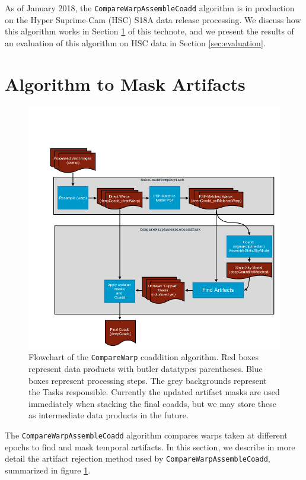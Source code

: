 \documentclass[DM,authoryear,toc]{lsstdoc}
\begin{document}
As of January 2018, the \texttt{CompareWarpAssembleCoadd} algorithm is in production on the Hyper Suprime-Cam (HSC) S18A data release processing.
We discuss how this algorithm works in Section \ref{sec:method} of this technote, and we present the results of an evaluation of this algorithm on HSC data in Section \ref{sec:evaluation}.

\section{Algorithm to Mask Artifacts}
\label{sec:method}

\begin{figure}
\includegraphics[width=1.0\textwidth]{figures/CompareWarpFlow.png}
\caption{Flowchart of the \texttt{CompareWarp} coaddition algorithm.\label{fig:flowchart} Red boxes represent data products with butler datatypes parentheses.  Blue boxes represent processing steps. The grey backgrounds represent the Tasks responsible.  Currently the updated artifact masks are used immediately when stacking the final coadds, but  we may store these as intermediate data products in the future.}
\end{figure}



The \texttt{CompareWarpAssembleCoadd} algorithm compares warps taken at different epochs to find and mask temporal artifacts.
In this section, we describe in more detail the artifact rejection method used by \texttt{CompareWarpAssembleCoadd}, summarized in figure \ref{fig:flowchart}.
\end{document}

